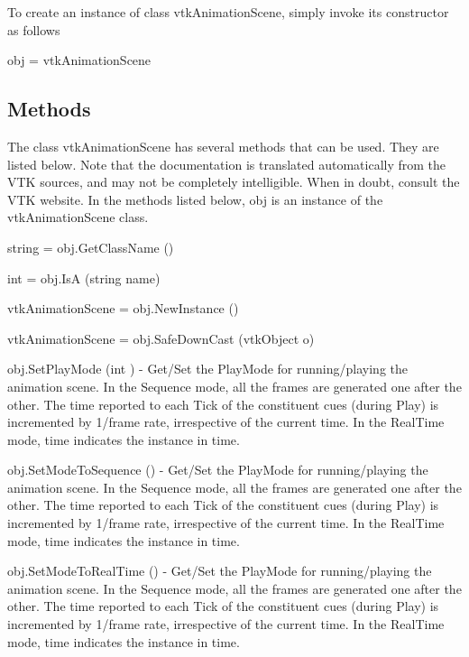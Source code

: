 To create an instance of class vtk\-Animation\-Scene, simply invoke its constructor as follows \begin{DoxyVerb}  obj = vtkAnimationScene
\end{DoxyVerb}
 \hypertarget{vtkwidgets_vtkxyplotwidget_Methods}{}\subsection{Methods}\label{vtkwidgets_vtkxyplotwidget_Methods}
The class vtk\-Animation\-Scene has several methods that can be used. They are listed below. Note that the documentation is translated automatically from the V\-T\-K sources, and may not be completely intelligible. When in doubt, consult the V\-T\-K website. In the methods listed below, {\ttfamily obj} is an instance of the vtk\-Animation\-Scene class. 
\begin{DoxyItemize}
\item {\ttfamily string = obj.\-Get\-Class\-Name ()}  
\item {\ttfamily int = obj.\-Is\-A (string name)}  
\item {\ttfamily vtk\-Animation\-Scene = obj.\-New\-Instance ()}  
\item {\ttfamily vtk\-Animation\-Scene = obj.\-Safe\-Down\-Cast (vtk\-Object o)}  
\item {\ttfamily obj.\-Set\-Play\-Mode (int )} -\/ Get/\-Set the Play\-Mode for running/playing the animation scene. In the Sequence mode, all the frames are generated one after the other. The time reported to each Tick of the constituent cues (during Play) is incremented by 1/frame rate, irrespective of the current time. In the Real\-Time mode, time indicates the instance in time.  
\item {\ttfamily obj.\-Set\-Mode\-To\-Sequence ()} -\/ Get/\-Set the Play\-Mode for running/playing the animation scene. In the Sequence mode, all the frames are generated one after the other. The time reported to each Tick of the constituent cues (during Play) is incremented by 1/frame rate, irrespective of the current time. In the Real\-Time mode, time indicates the instance in time.  
\item {\ttfamily obj.\-Set\-Mode\-To\-Real\-Time ()} -\/ Get/\-Set the Play\-Mode for running/playing the animation scene. In the Sequence mode, all the frames are generated one after the other. The time reported to each Tick of the constituent cues (during Play) is incremented by 1/frame rate, irrespective of the current time. In the Real\-Time mode, time indicates the instance in time.  

\end{DoxyItemize}
